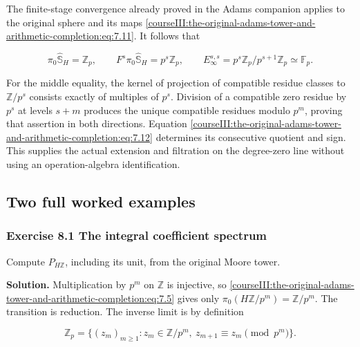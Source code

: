 The finite-stage convergence already proved in the Adams companion applies to the original sphere and its maps \eqref{courseIII:the-original-adams-tower-and-arithmetic-completion:eq:7.11}. It follows that

\begin{equation}
\pi_0\widehat{\mathbb S}_H=\mathbb Z_p,\qquad
F^s\pi_0\widehat{\mathbb S}_H=p^s\mathbb Z_p,\qquad
E_\infty^{s,s}=p^s\mathbb Z_p/p^{s+1}\mathbb Z_p\simeq\mathbb F_p.
\label{courseIII:the-original-adams-tower-and-arithmetic-completion:eq:7.13}
\end{equation}

For the middle equality, the kernel of projection of compatible residue classes to \(\mathbb Z/p^s\) consists exactly of multiples of \(p^s\). Division of a compatible zero residue by \(p^s\) at levels \(s+m\) produces the unique compatible residues modulo \(p^m\), proving that assertion in both directions. Equation \eqref{courseIII:the-original-adams-tower-and-arithmetic-completion:eq:7.12} determines its consecutive quotient and sign. This supplies the actual extension and filtration on the degree-zero line without using an operation-algebra identification.

\subsection{Two full worked examples}
\label{courseIII:the-original-adams-tower-and-arithmetic-completion:arithmetic-worked-examples}

\label{courseIII:the-original-adams-tower-and-arithmetic-completion:section-8}\label{courseIII:adams-arithmetic:8}

\subsubsection{Exercise 8.1 The integral coefficient spectrum}
\label{courseIII:the-original-adams-tower-and-arithmetic-completion:exercise-8.1}

Compute \(P_{H\mathbb Z}\), including its unit, from the original Moore tower.

\textbf{Solution.} Multiplication by \(p^m\) on \(\mathbb Z\) is injective, so \eqref{courseIII:the-original-adams-tower-and-arithmetic-completion:eq:7.5} gives only \(\pi_0(H\mathbb Z/p^m)=\mathbb Z/p^m\). The transition is reduction. The inverse limit is by definition

\begin{equation}
\mathbb Z_p=\{(z_m)_{m\geq1}:z_m\in\mathbb Z/p^m,\ z_{m+1}\equiv z_m\pmod{p^m}\}.
\label{courseIII:the-original-adams-tower-and-arithmetic-completion:eq:8.1}
\end{equation}

